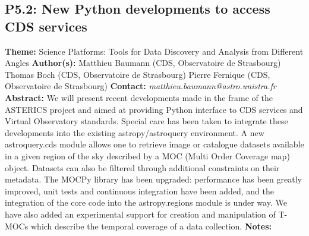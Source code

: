 \documentclass{report}
\begin{document}
{{{{{{{{{{{{{{\subsection*{P5.2: New Python developments to access CDS services}
{\bf Theme:}  Science Platforms: Tools for Data Discovery and Analysis from Different Angles\newline
{\bf Author(s):}\newline
Matthieu Baumann (CDS, Observatoire de Strasbourg) \newline Thomas Boch (CDS, Observatoire de Strasbourg) \newline  Pierre Fernique (CDS, Observatoire de Strasbourg)\newline   \newline  \newline  \newline\newline
{\bf Contact:} {\it matthieu.baumann@astro.unistra.fr}\newline
\newline\newline
{\bf Abstract:}\newline
We will present recent developments made in the frame of the ASTERICS project and aimed at providing Python interface to CDS services and Virtual Observatory standards. Special care has been taken to integrate these developments into the existing astropy/astroquery environment.
A new astroquery.cds module allows one to retrieve image or catalogue datasets available in a given region of the sky described by a MOC (Multi Order Coverage map) object. Datasets can also be filtered through additional constraints on their metadata.
The MOCPy library has been upgraded: performance has been greatly improved, unit tests and continuous integration have been added, and the integration of the core code into the astropy.regions module is under way. We have also added an experimental support for creation and manipulation of T-MOCs which describe the temporal coverage of a data collection.\newline
{\bf Notes:}\newline
{\newpage
}}}}}}}}}}}}}}}
\end{document}
